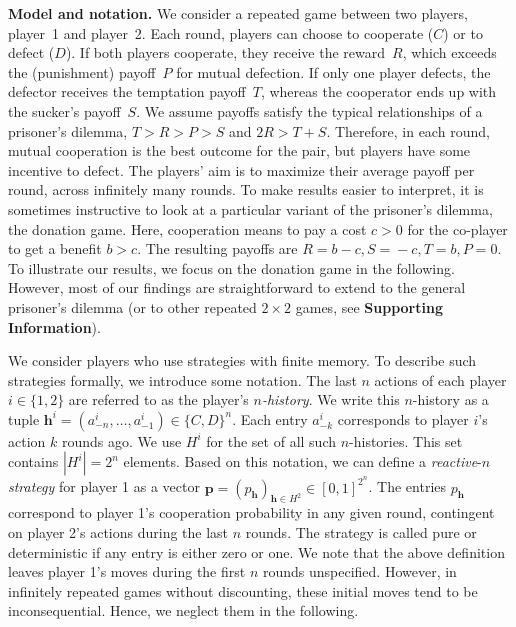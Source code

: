 \documentclass[9pt,twocolumn,twoside]{pnas-new}
\def\SI{\textbf{Supporting Information}}
\begin{document}
\textbf{Model and notation.}
We consider a repeated game between two players, player~1 and player~2.
Each round, players can choose to cooperate ($C$) or to defect ($D$). 
If both players cooperate, they receive the reward~$R$, which exceeds the (punishment) payoff~$P$ for mutual defection. 
If only one player defects, the defector receives the temptation payoff~$T$, whereas the cooperator ends up with the sucker's payoff~$S$. 
We assume payoffs satisfy the typical relationships of a prisoner's dilemma, $T \!>\! R \!>\! P \!>\! S$ and $2 R \!>\! T \!+\! S$. 
Therefore, in each round, mutual cooperation is the best outcome for the pair, but players have some incentive to defect. 
The players' aim is to maximize their average payoff per round, across infinitely many rounds.
To make results easier to interpret, it is sometimes instructive to look at a particular variant of the prisoner's dilemma, the donation game. 
Here, cooperation means to pay a cost $c\!>\!0$ for the co-player to get a benefit $b\!>\!c$.
The resulting payoffs are \(R \!\!=\! b\! -\! c, S \!=\! -c, T \!=\! b, P\!
=\! 0\). 
To illustrate our results, we focus on the donation game in the following. 
However, most of our findings are straightforward to extend to the general prisoner's dilemma (or to other repeated $2\!\times\!2$ games, see \SI). 

We consider players who use strategies with finite memory. 
To describe such strategies formally, we introduce some notation. 
The last $n$ actions of each player  $i\! \in\! \{1, 2\}$ are referred to as the player's {\it $n$-history}. 
We write this $n$-history as a tuple $\mathbf{h}^i\!=\!(a^i_{-n},\ldots,a^i_{-1})\!\in\!\{C,D\}^n$. 
Each entry $a^i_{-k}$ corresponds to player $i$'s action $k$ rounds ago. 
We use $H^i$ for the set of all such $n$-histories. 
This set contains $|H^i|\!=\!2^{n}$ elements. 
Based on this notation, we can define a {\it reactive}-$n$ {\it strategy} for player 1 as a vector $\mathbf{p}\!=\!(p_\mathbf{h})_{\mathbf{h}\in H^2} \!\in\! [0, 1]^{2^n}$. 
The entries $p_\mathbf{h}$ correspond to player 1's cooperation probability in any given round, contingent on player 2's actions during the last $n$ rounds. 
The strategy is called pure or deterministic if any entry is either zero or one. 
We note that the above definition leaves player 1's moves during the first $n$ rounds unspecified. 
However, in infinitely repeated games without discounting, these initial moves tend to be inconsequential. 
Hence, we neglect them in the following.
\end{document}
